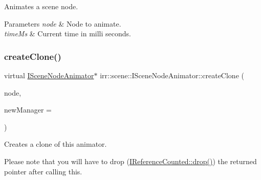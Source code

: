 Animates a scene node. 


\begin{DoxyParams}{Parameters}
{\em node} & Node to animate. \\
\hline
{\em time\+Ms} & Current time in milli seconds. \\
\hline
\end{DoxyParams}
\mbox{\label{classirr_1_1scene_1_1ISceneNodeAnimator_a9cc261c12459fc7d3da6c2595d721c0d}} 
\subsubsection{\texorpdfstring{create\+Clone()}{createClone()}\hspace{0.1cm}{\footnotesize\ttfamily [1/2]}}
{\footnotesize\ttfamily virtual \hyperlink{classirr_1_1scene_1_1ISceneNodeAnimator}{I\+Scene\+Node\+Animator}$\ast$ irr\+::scene\+::\+I\+Scene\+Node\+Animator\+::create\+Clone (\begin{DoxyParamCaption}\item[{\hyperlink{classirr_1_1scene_1_1ISceneNode}{I\+Scene\+Node} $\ast$}]{node,  }\item[{\hyperlink{classirr_1_1scene_1_1ISceneManager}{I\+Scene\+Manager} $\ast$}]{new\+Manager = {} }\end{DoxyParamCaption})\hspace{0.3cm}{\ttfamily [pure virtual]}}



Creates a clone of this animator. 

Please note that you will have to drop (\hyperlink{classirr_1_1IReferenceCounted_a03856a09355b89d178090c4a5f738543}{I\+Reference\+Counted\+::drop()}) the returned pointer after calling this. \mbox{\label{classirr_1_1scene_1_1ISceneNodeAnimator_a9cc261c12459fc7d3da6c2595d721c0d}} 
